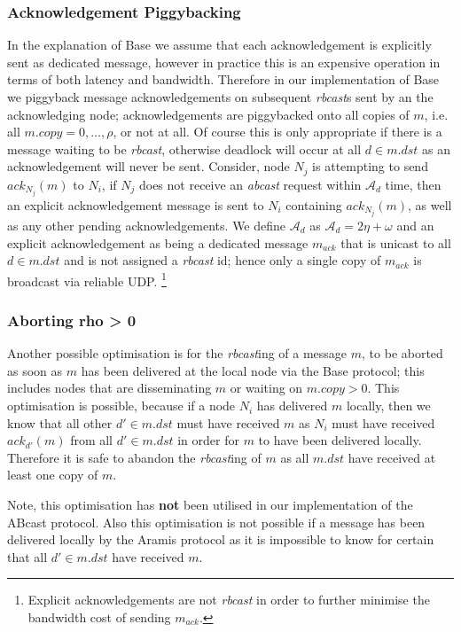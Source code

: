     \subsubsection*{Acknowledgement Piggybacking}
    In the explanation of \textsf{Base} we assume that each acknowledgement is explicitly sent as dedicated message, however in practice this is an expensive operation in terms of both latency and bandwidth.  Therefore in our implementation of \textsf{Base} we piggyback message acknowledgements on subsequent \emph{rbcast}s sent by an the acknowledging node; acknowledgements are piggybacked onto all copies of $m$, i.e. all $m.copy =0,\ldots,\rho$, or not at all.  Of course this is only appropriate if there is a message waiting to be \emph{rbcast}, otherwise deadlock will occur at all $d \in m.dst$ as an acknowledgement will never be sent.  Consider, node $N_j$ is attempting to send $ack_{N_j}(m)$ to $N_i$, if $N_j$ does not receive an \emph{abcast} request within $\mathcal{A}_d$ time, then an explicit acknowledgement message is sent to $N_i$ containing $ack_{N_j}(m)$, as well as any other pending acknowledgements.  We define $\mathcal{A}_d$ as $\mathcal{A}_d = 2\eta + \omega$ and an explicit acknowledgement as being a dedicated message $m_{ack}$ that is unicast to all $d \in m.dst$ and is not assigned a \emph{rbcast} id; hence only a single copy of $m_{ack}$ is broadcast via reliable UDP.  \footnote{Explicit acknowledgements are not \emph{rbcast} in order to further minimise the bandwidth cost of sending $m_{ack}$.}
    
    \subsubsection*{Aborting rho > 0}
    Another possible optimisation is for the \emph{rbcast}ing of a message $m$, to be aborted as soon as $m$ has been delivered at the local node via the \textsf{Base} protocol; this includes nodes that are disseminating $m$ or waiting on $m.copy > 0$.  This optimisation is possible, because if a node $N_i$ has delivered $m$ locally, then we know that all other $d' \in m.dst$ must have received $m$ as $N_i$ must have received $ack_{d'}(m)$ from all $d' \in m.dst$ in order for $m$ to have been delivered locally.  Therefore it is safe to abandon the \emph{rbcast}ing of $m$ as all $m.dst$ have received at least one copy of $m$. 
    
    Note, this optimisation has \textbf{not} been utilised in our implementation of the \textsf{ABcast} protocol.  Also this optimisation is not possible if a message has been delivered locally by the \textsf{Aramis} protocol as it is impossible to know for certain that all $d' \in m.dst$ have received $m$.  

